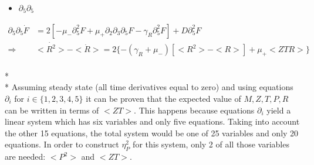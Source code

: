 \documentclass{article}
\begin{document}
\begin{itemize}
    \item $\partial_5\partial_5$
\end{itemize}
\begin{align*}
    \partial_5\partial_5\Dot{F} &= 2[-\mu_-\partial_5^2F + \mu_+\partial_2\partial_3\partial_5F - \gamma_R\partial_5^2F] + D\partial_5^2F\\
            \Longrightarrow     & <\Dot{R^2}> - <\Dot{R}> = 2\{-(\gamma_R+ \mu_-)[<R^2> -<R>] + \mu_+<ZTR>\}
\end{align*}
\\*
\\*
Assuming steady state (all time derivatives equal to zero) and using equations $\partial_i$ for $i\in\{1,2,3,4,5\}$ it can be proven that the expected value of $M, Z, T, P, R$ can be written in terms of $<ZT>$. This happens because equations $\partial_i$ yield a linear system which has six variables and only five equations. Taking into account the other 15 equations, the total system would be one of 25 variables and only 20 equations. In order to construct $\eta_P^2$ for this system, only 2 of all those variables are needed: $<P^2>$ and $<ZT>$.
\end{document}
